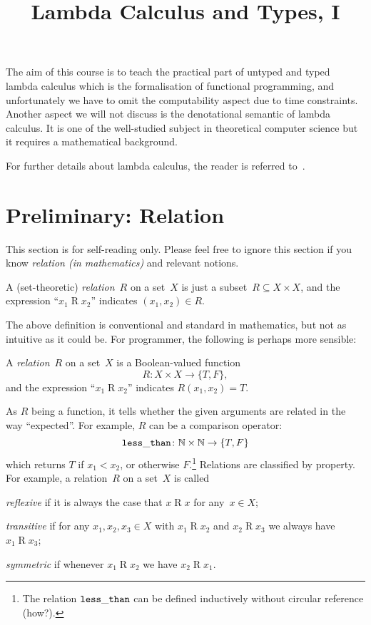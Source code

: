\title{Lambda Calculus and Types, I}

\begin{frame}
\maketitle
\end{frame}

The aim of this course is to teach the practical part of untyped and typed
lambda calculus which is the formalisation of functional programming,
and unfortunately we have to omit the computability aspect due to time
constraints. Another aspect we will not discuss is the denotational semantic of
lambda calculus. It is one of the well-studied subject in theoretical computer
science but it requires a mathematical background.


For further details about lambda calculus, the reader is referred
to~\cite{Barendregt1984,Barendregt1992}. 

\section{Preliminary: Relation}
This section is for self-reading only. Please feel free to ignore this section
if you know \emph{relation (in mathematics)} and relevant notions.

\begin{definition}[Classical]
  A (set-theoretic) \emph{relation}~$R$ on a set~$X$ is just a subset~$R
  \subseteq X \times X$, and the expression ``$x_1 \mathbin{R} x_2$'' indicates
  $(x_1, x_2) \in R$.
\end{definition}
The above definition is conventional and standard in mathematics, but not as
intuitive as it could be. For programmer, the following is perhaps more
sensible:
\begin{definition}[Functional]
  A \emph{relation}~$R$ on a set~$X$ is a Boolean-valued function 
  \[
    R\colon X \times X \to \{T, F\},
  \]
  and the expression ``$x_1 \mathbin{R} x_2$'' indicates $R(x_1, x_2) = T$.
\end{definition}
As $R$ being a function, it tells whether the given arguments are related in the
way ``expected''. For example, $R$ can be a comparison operator:
\[
  {\tt less\_than}\colon \mathbb{N} \times \mathbb{N} \to \{T, F\}
\]
which returns $T$ if $x_1 < x_2$, or otherwise $F$.\footnote{%
  The relation ${\tt less\_than}$ can be defined inductively without circular
  reference (how?).}
Relations are classified by property. For example,
a relation~$R$ on a set~$X$ is called
\begin{inparaenum}[(a)]
  \item \emph{reflexive} if it is always the case that $x\mathbin{R}x$ for
    any~$x \in X$;
  \item \emph{transitive} if for any $x_1, x_2, x_3 \in X$ with $x_1 \mathbin{R}
    x_2$ and $x_2 \mathbin{R} x_3$ we always have $x_1 \mathbin{R} x_3$;
  \item \emph{symmetric} if whenever $x_1 \mathbin{R} x_2$ we have $x_2
    \mathbin{R} x_1$. 
\end{inparaenum}
